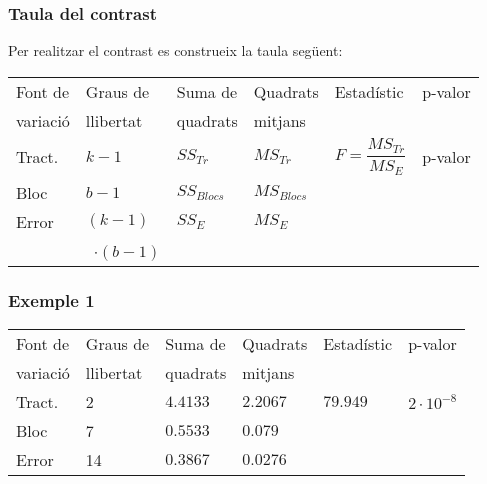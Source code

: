\documentclass[12pt,t]{beamer}
\theoremstyle{plain}
\theoremstyle{definition}
\begin{document}
\begin{frame}
\frametitle{Taula del contrast}

Per realitzar el contrast es construeix la taula següent:
{\small \begin{center}
\hspace*{-2ex}\begin{tabular}{|@{}l@{}|l@{}|l@{}|l@{}|l|l|}
\hline
Font de&Graus de&Suma de&Quadrats&Estadístic & p-valor\\
variació&llibertat&quadrats&mitjans& & \\\hline
Tract.&$k-1$ & $SS_{Tr}$&$MS_{Tr}$&$F=\dfrac{MS_{Tr}^{\ }}{MS_E}$ & p-valor\\[2ex]
Bloc&$b-1$&$SS_{Blocs}$&$MS_{Blocs}$& &\\[2ex]
Error&$(k-1)$&$SS_{E}$&$MS_E$& &\\
 & \ $\cdot (b-1)$ & & & & \\
\hline
\end{tabular}
\end{center}
}
\end{frame}



\begin{frame}
\frametitle{Exemple 1}

{\small \begin{center}
\hspace*{-2ex}\begin{tabular}{|@{}l@{}|l@{}|l@{}|l@{}|l|l|}
\hline
Font de&Graus de&Suma de&Quadrats&Estadístic & p-valor\\
variació&llibertat&quadrats&mitjans& & \\\hline
Tract.& 2 & $4.4133$&$2.2067$&$79.949$ & $2\cdot 10^{-8}$\\[2ex]
Bloc& 7 &$0.5533$&$0.079$& &\\[2ex]
Error& 14 &$0.3867$&$0.0276$& &\\
\hline
\end{tabular}
\end{center}
}
\end{frame}

%
%
\end{document}
